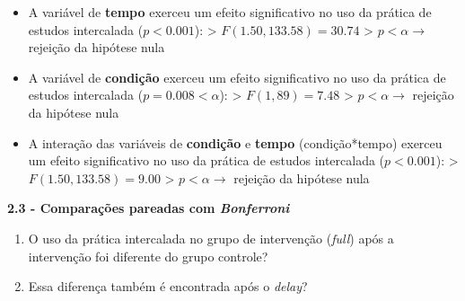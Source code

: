 \documentclass[
]{article}
\providecommand{\tightlist}{%
  \setlength{\itemsep}{0pt}\setlength{\parskip}{0pt}}
\begin{document}
\begin{itemize}
\tightlist
\item
  A variável de \textbf{tempo} exerceu um efeito significativo no uso da
  prática de estudos intercalada (\(p < 0.001\)): \textgreater{}
  \(F(1.50, 133.58) = 30.74\) \textgreater{} \(p < \alpha →\) rejeição
  da hipótese nula
\end{itemize}

\begin{itemize}
\tightlist
\item
  A variável de \textbf{condição} exerceu um efeito significativo no uso
  da prática de estudos intercalada (\(p = 0.008 < \alpha\)):
  \textgreater{} \(F(1, 89) = 7.48\) \textgreater{} \(p < \alpha →\)
  rejeição da hipótese nula
\end{itemize}

\begin{itemize}
\tightlist
\item
  A interação das variáveis de \textbf{condição} e \textbf{tempo}
  (condição*tempo) exerceu um efeito significativo no uso da prática de
  estudos intercalada (\(p < 0.001\)): \textgreater{}
  \(F(1.50, 133.58) = 9.00\) \textgreater{} \(p < \alpha →\) rejeição da
  hipótese nula
\end{itemize}

\textbf{2.3 - Comparações pareadas com \emph{Bonferroni}}

\begin{enumerate}
\def\labelenumi{\arabic{enumi}.}
\tightlist
\item
  O uso da prática intercalada no grupo de intervenção (\emph{full})
  após a intervenção foi diferente do grupo controle?
\item
  Essa diferença também é encontrada após o \emph{delay}?
\end{enumerate}
\end{document}
